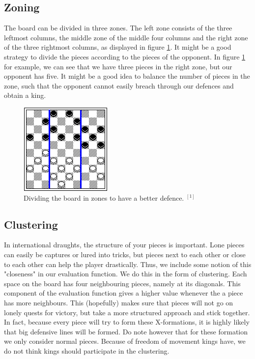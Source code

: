 \documentclass[10pt,a4paper]{article}
\begin{document}
\subsection{Zoning}
The board can be divided in three zones. The left zone consists of the three leftmost columns, the middle zone of the middle four columns and the right zone of the three rightmost columns, as displayed in figure \ref{zoning}. It might be a good strategy to divide the pieces according to the pieces of the opponent. In figure \ref{zoning} for example, we can see that we have three pieces in the right zone, but our opponent has five. It might be a good idea to balance the number of pieces in the zone, such that the opponent cannot easily breach through our defences and obtain a king.

\begin{figure}[h!]
	\begin{center}
	\includegraphics{./images/zoning.png}
	\caption{Dividing the board in zones to have a better defence. $^{[1]}$}
	\label{zoning}
	\end{center}
\end{figure}

\subsection{Clustering}
In international draughts, the structure of your pieces is important. Lone pieces can easily be captures or lured into tricks, but pieces next to each other or close to each other can help the player drastically. Thus, we include some notion of this "closeness" in our evaluation function. We do this in the form of clustering. Each space on the board has four neighbouring pieces, namely at its diagonals. This component of the evaluation function gives a higher value whenever the a piece has more neighbours. This (hopefully) makes sure that pieces will not go on lonely quests for victory, but take a more structured approach and stick together. In fact, because every piece will try to form these X-formations, it is highly likely that big defensive lines will be formed. Do note however that for these formation we only consider normal pieces. Because of freedom of movement kings have, we do not think kings should participate in the clustering.
\end{document}
